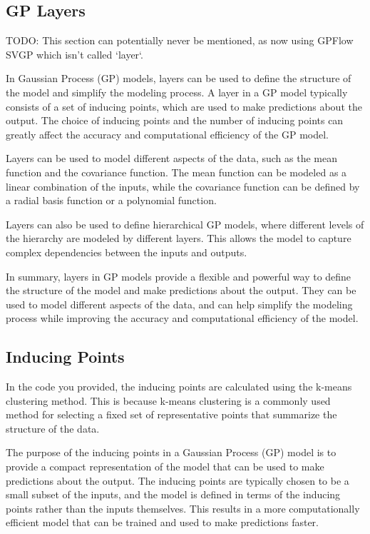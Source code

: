 \documentclass[12pt,a4paper]{report}
\begin{document}
\subsection{GP Layers}

TODO: This section can potentially never be mentioned, as now using GPFlow SVGP which isn't called `layer`.

In Gaussian Process (GP) models, layers can be used to define the structure of the model and simplify the modeling process. 
A layer in a GP model typically consists of a set of inducing points, which are used to make predictions about the output. 
The choice of inducing points and the number of inducing points can greatly affect the accuracy and computational efficiency of the GP model.

Layers can be used to model different aspects of the data, such as the mean function and the covariance function. 
The mean function can be modeled as a linear combination of the inputs, while the covariance function can be defined by a radial basis function or a polynomial function.

Layers can also be used to define hierarchical GP models, where different levels of the hierarchy are modeled by different layers. 
This allows the model to capture complex dependencies between the inputs and outputs.

In summary, layers in GP models provide a flexible and powerful way to define the structure of the model and make predictions about the output. 
They can be used to model different aspects of the data, and can help simplify the modeling process while improving the accuracy and computational efficiency of the model.

\subsection{Inducing Points}

In the code you provided, the inducing points are calculated using the k-means clustering method. 
This is because k-means clustering is a commonly used method for selecting a fixed set of representative points that summarize the structure of the data.

The purpose of the inducing points in a Gaussian Process (GP) model is to provide a compact representation of the model that can be used to make predictions about the output. 
The inducing points are typically chosen to be a small subset of the inputs, and the model is defined in terms of the inducing points rather than the inputs themselves. 
This results in a more computationally efficient model that can be trained and used to make predictions faster.
\end{document}
